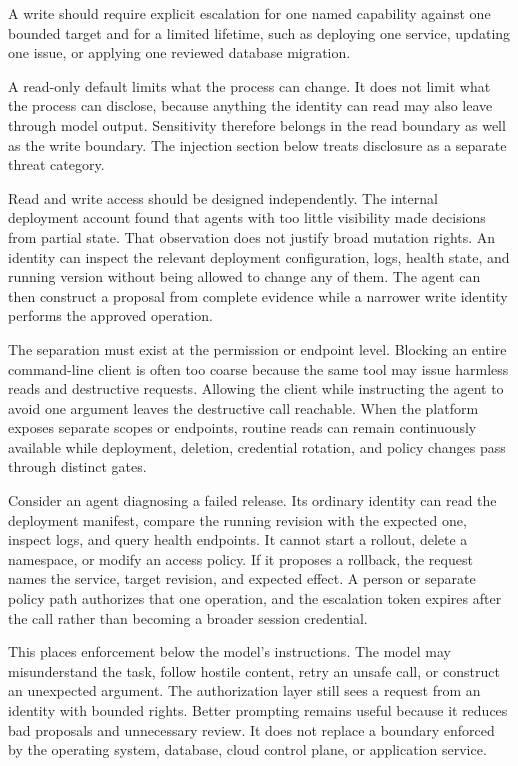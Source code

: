A write should require explicit escalation for one named capability against one bounded target and for a limited lifetime, such as deploying one service, updating one issue, or applying one reviewed database migration.

A read-only default limits what the process can change. It does not limit what the process can disclose, because anything the identity can read may also leave through model output. Sensitivity therefore belongs in the read boundary as well as the write boundary. The injection section below treats disclosure as a separate threat category.

Read and write access should be designed independently. The internal deployment account found that agents with too little visibility made decisions from partial state. That observation does not justify broad mutation rights. An identity can inspect the relevant deployment configuration, logs, health state, and running version without being allowed to change any of them. The agent can then construct a proposal from complete evidence while a narrower write identity performs the approved operation.

The separation must exist at the permission or endpoint level. Blocking an entire command-line client is often too coarse because the same tool may issue harmless reads and destructive requests. Allowing the client while instructing the agent to avoid one argument leaves the destructive call reachable. When the platform exposes separate scopes or endpoints, routine reads can remain continuously available while deployment, deletion, credential rotation, and policy changes pass through distinct gates.

Consider an agent diagnosing a failed release. Its ordinary identity can read the deployment manifest, compare the running revision with the expected one, inspect logs, and query health endpoints. It cannot start a rollout, delete a namespace, or modify an access policy. If it proposes a rollback, the request names the service, target revision, and expected effect. A person or separate policy path authorizes that one operation, and the escalation token expires after the call rather than becoming a broader session credential.

This places enforcement below the model's instructions. The model may misunderstand the task, follow hostile content, retry an unsafe call, or construct an unexpected argument. The authorization layer still sees a request from an identity with bounded rights. Better prompting remains useful because it reduces bad proposals and unnecessary review. It does not replace a boundary enforced by the operating system, database, cloud control plane, or application service.


